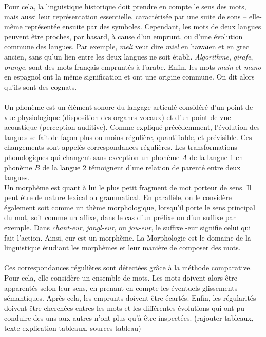\documentclass[12pt, french, twoside]{report}
\begin{document}
\indent Pour cela, la linguistique historique doit prendre en compte le sens des mots, mais aussi leur représentation essentielle, caractérisée par une suite de sons -- elle-même représentée ensuite par des symboles. Cependant, les mots de deux langues peuvent être proches, par hasard, à cause d'un emprunt, ou d'une évolution commune des langues.
Par exemple, \textit{meli} veut dire \textit{miel} en hawaïen et en grec ancien, sans qu'un lien entre les deux langues ne soit établi. \textit{Algorithme}, \textit{girafe}, \textit{orange}, sont des mots français empruntés à l'arabe. Enfin, les mots \textit{main} et \textit{mano} en espagnol ont la même signification et ont une origine commune. On dit alors qu'ils sont des cognats.\\ \\ 
\indent Un phonème est un élément sonore du langage articulé considéré d'un point de vue physiologique (disposition des organes vocaux) et d'un point de vue acoustique (perception auditive). Comme expliqué précédemment, l'évolution des langues se fait de façon plus ou moins régulière, quantifiable, et prévisible. Ces changements sont appelés correspondances régulières. Les transformations phonologiques qui changent sans exception un phonème $A$ de la langue 1 en phonème $B$ de la langue 2 témoignent d'une relation de parenté entre deux langues.\\
\indent Un morphème est quant à lui le plus petit fragment de mot porteur de sens. Il peut être de nature lexical ou grammatical. En parallèle, on le considère également soit comme un thème morphologique, lorsqu'il porte le sens principal du mot, soit comme un affixe, dans le cas d'un préfixe ou d'un suffixe par exemple. Dans \textit{chant-eur}, \textit{jongl-eur}, ou \textit{jou-eur}, le suffixe  \og -eur \fg signifie celui qui fait l'action. Ainsi, \og eur \fg est un morphème. La Morphologie est le domaine de la linguistique étudiant les morphèmes et leur manière de composer des mots. \\ \\ 
\indent Ces correspondances régulières sont détectées grâce à la méthode comparative. Pour cela, elle considère un ensemble de mots. Les mots doivent alors être apparentés selon leur sens, en prenant en compte les éventuels glissements sémantiques. Après cela, les emprunts doivent être écartés. Enfin, les régularités doivent être cherchées entres les mots et les différentes évolutions qui ont pu conduire des uns aux autres n'ont plus qu'à être inspectées. (rajouter tableaux, texte explication tableaux, sources tableau)\\
\end{document}

